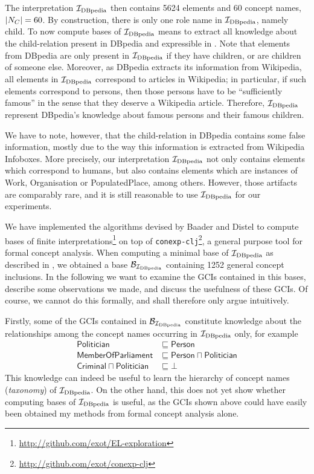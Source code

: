 The interpretation ${\mathcal{I}_{\text{DBpedia}}}$ then contains 5624 elements and 60 concept names, \ie
$\lvert N_C \rvert = 60$.  By construction, there is only one role name in ${\mathcal{I}_{\text{DBpedia}}}$, namely
\textsf{child}.  To now compute bases of ${\mathcal{I}_{\text{DBpedia}}}$ means to extract all knowledge about
the child-relation present in DBpedia and expressible in \ELbot.  Note that elements from
DBpedia are only present in ${\mathcal{I}_{\text{DBpedia}}}$ if they have children, or are children of someone
else.  Moreover, as DBpedia extracts its information from Wikipedia, all elements in
${\mathcal{I}_{\text{DBpedia}}}$ correspond to articles in Wikipedia; in particular, if such elements
correspond to persons, then those persons have to be ``sufficiently famous'' in the sense
that they deserve a Wikipedia article.  Therefore, ${\mathcal{I}_{\text{DBpedia}}}$ represent DBpedia's
knowledge about famous persons and their famous children.

We have to note, however, that the \textsf{child}-relation in DBpedia contains some false
information, mostly due to the way this information is extracted from Wikipedia Infoboxes.
More precisely, our interpretation ${\mathcal{I}_{\text{DBpedia}}}$ not only contains elements which correspond
to humans, but also contains elements which are instances of \textsf{Work},
\textsf{Organisation} or \textsf{PopulatedPlace}, among others.  However, those artifacts
are comparably rare, and it is still reasonable to use ${\mathcal{I}_{\text{DBpedia}}}$ for our experiments.

We have implemented the algorithms devised by Baader and Distel to compute bases of finite
interpretations\footnote{\url{http://github.com/exot/EL-exploration}} on top of
\texttt{conexp-clj}\footnote{\url{http://github.com/exot/conexp-clj}}, a general purpose
tool for formal concept analysis.  When computing a minimal base of ${\mathcal{I}_{\text{DBpedia}}}$ as
described in , we obtained a base $\mathcal{B}_{{\mathcal{I}_{\text{DBpedia}}}}$
containing 1252 general concept inclusions.  In the following we want to examine the GCIs
contained in this bases, describe some observations we made, and discuss the usefulness of
these GCIs.  Of course, we cannot do this formally, and shall therefore only argue
intuitively.

Firstly, some of the GCIs contained in $\mathcal{B}_{\mathcal{I}_{\text{DBpedia}}}$ constitute knowledge about
the relationships among the concept names occurring in ${\mathcal{I}_{\text{DBpedia}}}$ only, for example
\begin{align*}
  \mathsf{Politician} &\sqsubseteq \mathsf{Person} \\
  \mathsf{MemberOfParliament} &\sqsubseteq \mathsf{Person \sqcap Politician} \\
  \mathsf{Criminal \sqcap Politician} &\sqsubseteq \bot
\end{align*}
This knowledge can indeed be useful to learn the hierarchy of concept names
(\emph{taxonomy}) of ${\mathcal{I}_{\text{DBpedia}}}$.  On the other hand, this does not yet show whether
computing bases of ${\mathcal{I}_{\text{DBpedia}}}$ is useful, as the GCIs shown above could have easily been
obtained my methods from formal concept analysis alone.

